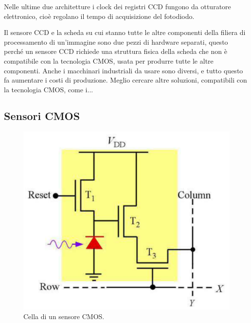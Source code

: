 \documentclass[a4paper,11pt]{article}
\begin{document}
Nelle ultime due architetture i clock dei registri CCD fungono da otturatore elettronico, cioè regolano il tempo di acquisizione
del fotodiodo.
\par
Il sensore CCD e la scheda su cui stanno tutte le altre componenti della filiera di processamento di un'immagine
sono due pezzi di hardware separati, questo perché un sensore CCD richiede una struttura fisica della scheda che non è compatibile
con la tecnologia CMOS, usata per produrre tutte le altre componenti. Anche i macchinari industriali da usare sono diversi, e tutto questo fa aumentare i costi di produzione. Meglio cercare altre soluzioni, compatibili con la tecnologia CMOS, come i...

\subsection{Sensori CMOS}

\renewcommand{\thefigure}{3.14}
\begin{figure}[!h]
  \centering
    \includegraphics[scale=0.4]{images/3/cmos_cell.png}
    \caption{Cella di un sensore CMOS.}
\end{figure}
\end{document}
